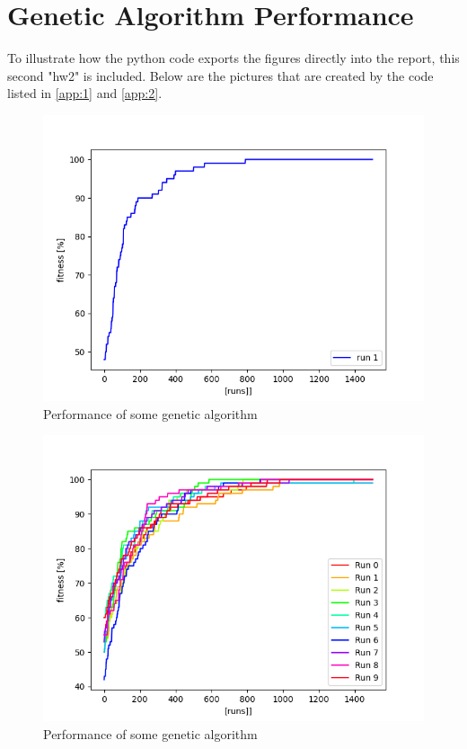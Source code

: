 \section{Genetic Algorithm Performance}\label{sec:1}
To illustrate how the python code exports the figures directly into the report, this second "hw2" is included. Below are the pictures that are created by the code listed in \cref{app:1} and \cref{app:2}.
\begin{figure}[H]
    \centering
    \includegraphics[width=1\textwidth]{Images/4a.png}
    \caption{Performance of some genetic algorithm}
\end{figure}

\begin{figure}[H]
    \centering
    \includegraphics[width=1\textwidth]{Images/4b.png}
    \caption{Performance of some genetic algorithm}
\end{figure}